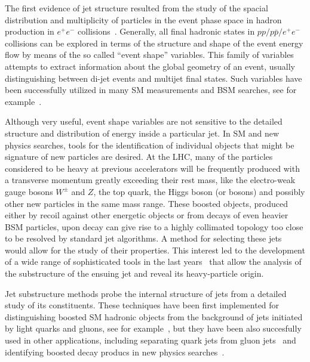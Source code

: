 The first evidence of jet structure resulted from the study of the spacial distribution and multiplicity of particles in the event phase space in hadron production in $e^+ e^-$ collisions~\cite{PhysRevLett.35.1609}.
Generally, all final hadronic states in $pp/p\bar{p}/e^+e^-$ collisions can be explored in terms of the structure and shape of the event energy flow by means of the so called ``event shape'' variables. This family of variables attempts to extract information about the global geometry of an event, usually distinguishing between di-jet events and multijet final states. Such variables have been successfully utilized in many SM measurements and BSM searches, see for example~\cite{Abbiendi:2007aa,Aad:2012np}. 

Although very useful, event shape variables are not sensitive to the detailed structure and distribution of energy inside a particular jet. In SM and new physics searches, tools for the identification of individual objects that might be signature of new particles are desired. 
At the LHC, many of the particles considered to be heavy at previous accelerators will be frequently produced with a transverse momentum greatly exceeding their rest mass, like the electro-weak gauge bosons $W^\pm$ and $Z$, the top quark, the Higgs boson (or bosons) and possibly other new particles in the same mass range. These boosted objects, produced either by recoil against other energetic objects or from decays of even heavier BSM particles, upon decay can give rise to a highly collimated topology too close to be resolved by standard jet algorithms. 
A method for selecting these jets would allow for the study of their properties.   This interest led to the development of a wide range of %
sophisticated tools in the last years~\cite{boost2010,boost2010b} that allow the analysis of the substructure of the ensuing jet and reveal its heavy-particle origin.

  Jet substructure methods probe the internal structure of jets from a detailed study of its constituents. These techniques have been first implemented for distinguishing boosted SM hadronic objects from the background of jets initiated by light quarks and gluons, see for example~\cite{ATLASBoostedHbb},
but they have been also succesfully used in other applications, including separating quark jets from gluon jets~\cite{PhysRevLett.107.172001} and identifying boosted decay producs in new physics searches~\cite{PhysRevD.82.095012}.

